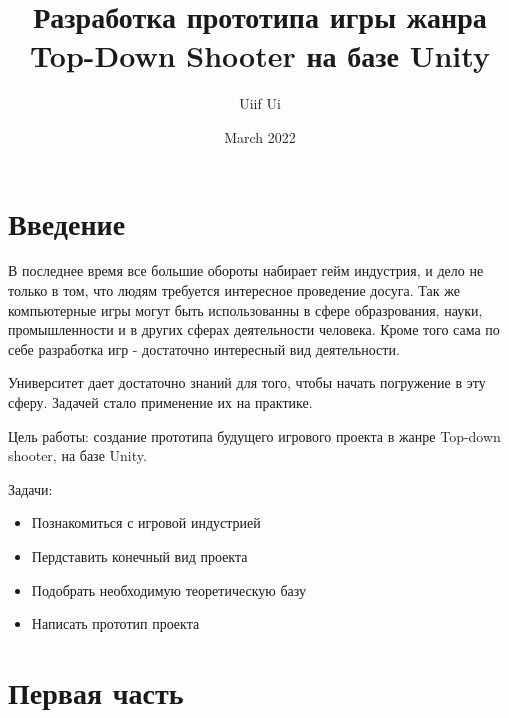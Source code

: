 \documentclass[14pt, titlepage,fleqn,a4paper]{extarticle}
\title{Разработка прототипа игры жанра Top-Down Shooter на базе Unity}
\author{Uiif Ui}
\date{March 2022}
\begin{document}
    \maketitle
	\tableofcontents   
	\setcounter{page}{1}
	\newpage
	\section*{Введение}
	В последнее время все большие обороты набирает гейм индустрия, и дело не только в том, что людям требуется интересное проведение досуга. Так же компьютерные игры могут быть использованны в сфере образрования, науки, промышленности и в других сферах деятельности человека. Кроме того сама по себе разработка игр - достаточно интересный вид деятельности. 
	
	Университет дает достаточно знаний для того, чтобы начать погружение в эту сферу. Задачей стало применение их на практике. 
	
    Цель работы: создание прототипа будущего игрового проекта в жанре Top-down shooter, на базе Unity.
    
    Задачи:
    \begin{itemize}
        \item Познакомиться с игровой индустрией
        \item  Пердставить конечный вид проекта
        \item Подобрать необходимую теоретическую базу
        \item Написать прототип проекта
    \end{itemize}

    \section*{Первая часть}
	
	
\end{document}

